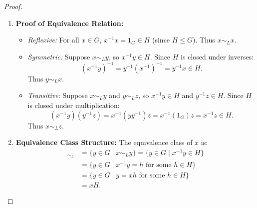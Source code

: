 \begin{proof}
\begin{enumerate}[label=\textbf{(\roman*)}, leftmargin=*, itemsep=8pt]
    \item \textbf{Proof of Equivalence Relation:}
    \begin{itemize}[leftmargin=1.5em, itemsep=4pt]
        \item \emph{Reflexive:} For all $x \in G$, $x^{-1}x = 1_G \in H$ (since $H \le G$). Thus $x \sim_L x$.
        \item \emph{Symmetric:} Suppose $x \sim_L y$, so $x^{-1}y \in H$. Since $H$ is closed under inverses:
        \begin{equation*}
        (x^{-1}y)^{-1} = y^{-1}(x^{-1})^{-1} = y^{-1}x \in H.
        \end{equation*}
        Thus $y \sim_L x$.
        \item \emph{Transitive:} Suppose $x \sim_L y$ and $y \sim_L z$, so $x^{-1}y \in H$ and $y^{-1}z \in H$.
        Since $H$ is closed under multiplication:
        \begin{equation*}
        (x^{-1}y)(y^{-1}z) = x^{-1}(yy^{-1})z = x^{-1}(1_G)z = x^{-1}z \in H.
        \end{equation*}
        Thus $x \sim_L z$.
    \end{itemize}

    \item \textbf{Equivalence Class Structure:}
    The equivalence class of $x$ is:
    \begin{align*}
    [x]_{\sim_L} &= \{ y \in G \mid x \sim_L y \} = \{ y \in G \mid x^{-1}y \in H \} \\
    &= \{ y \in G \mid x^{-1}y = h \text{ for some } h \in H \} \\
    &= \{ y \in G \mid y = xh \text{ for some } h \in H \} \\
    &= xH.
    \end{align*}


\end{enumerate}
\end{proof}

